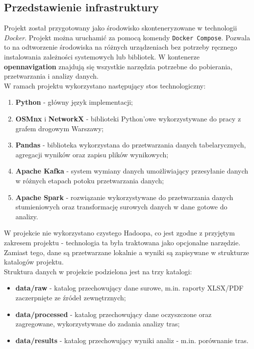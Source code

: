 \documentclass[12pt]{article}
\begin{document}
\subsection{Przedstawienie infrastruktury}
Projekt został przygotowany jako środowisko skonteneryzowane w technologii \emph{Docker}. Projekt można uruchamić za pomocą komendy \verb|Docker Compose|.
Pozwala to na odtworzenie środowiska na różnych urządzeniach bez potrzeby ręcznego instalowania zależności systemowych lub bibliotek.
W kontenerze \textbf{opennavigation} znajdują się wszystkie narzędzia potrzebne do pobierania, przetwarzania i analizy danych.\\

W ramach projektu wykorzystano następujący stos technologiczny:
\begin{enumerate}
    \item \textbf{Python} - główny język implementacji;
    \item \textbf{OSMnx} i \textbf{NetworkX} - biblioteki Python'owe wykorzystywane do pracy z grafem drogowym Warszawy;
    \item \textbf{Pandas} - biblioteka wykorzystana do przetwarzania danych tabelarycznych, agregacji wyników oraz zapisu plików wynikowych;
    \item \textbf{Apache Kafka} - system wymiany danych umożliwiający przesyłanie danych w różnych etapach potoku przetwarzania danych;
    \item \textbf{Apache Spark} - rozwiązanie wykorzystywane do przetwarzania danych stumieniowych oraz transformację surowych danych w dane gotowe do analizy.
\end{enumerate}

\noindent W projekcie nie wykorzystano czystego Hadoopa, co jest zgodne z przyjętym zakresem projektu - technologia ta była traktowana
jako opcjonalne narzędzie. Zamiast tego, dane są przetwarzane lokalnie a wyniki są zapisywane w strukturze katalogów projektu.\\

\noindent Struktura danych w projekcie podzielona jest na trzy katalogi:
\begin{itemize}
    \item \textbf{data/raw} - katalog przechowujący dane surowe, m.in. raporty XLSX/PDF zaczerpnięte ze źródeł zewnętrznych;
    \item \textbf{data/processed} - katalog przechowujący dane oczyszczone oraz zagregowane, wykorzystywane do zadania analizy tras;
    \item \textbf{data/results} - katalog przechowujący wyniki analiz - m.in. porównanie tras.
\end{itemize}
\end{document}
